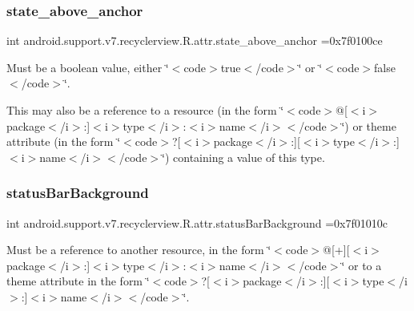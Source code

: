 \subsubsection{\texorpdfstring{state\+\_\+above\+\_\+anchor}{state\_above\_anchor}}
{\footnotesize\ttfamily int android.\+support.\+v7.\+recyclerview.\+R.\+attr.\+state\+\_\+above\+\_\+anchor =0x7f0100ce\hspace{0.3cm}{\ttfamily [static]}}

Must be a boolean value, either \char`\"{}$<$code$>$true$<$/code$>$\char`\"{} or \char`\"{}$<$code$>$false$<$/code$>$\char`\"{}. 

This may also be a reference to a resource (in the form \char`\"{}$<$code$>$@\mbox{[}$<$i$>$package$<$/i$>$\+:\mbox{]}$<$i$>$type$<$/i$>$\+:$<$i$>$name$<$/i$>$$<$/code$>$\char`\"{}) or theme attribute (in the form \char`\"{}$<$code$>$?\mbox{[}$<$i$>$package$<$/i$>$\+:\mbox{]}\mbox{[}$<$i$>$type$<$/i$>$\+:\mbox{]}$<$i$>$name$<$/i$>$$<$/code$>$\char`\"{}) containing a value of this type. \mbox{\label{classandroid_1_1support_1_1v7_1_1recyclerview_1_1R_1_1attr_abd953a9446d21bb5122214876a4d4a55}} 
\subsubsection{\texorpdfstring{status\+Bar\+Background}{statusBarBackground}}
{\footnotesize\ttfamily int android.\+support.\+v7.\+recyclerview.\+R.\+attr.\+status\+Bar\+Background =0x7f01010c\hspace{0.3cm}{\ttfamily [static]}}

Must be a reference to another resource, in the form \char`\"{}$<$code$>$@\mbox{[}+\mbox{]}\mbox{[}$<$i$>$package$<$/i$>$\+:\mbox{]}$<$i$>$type$<$/i$>$\+:$<$i$>$name$<$/i$>$$<$/code$>$\char`\"{} or to a theme attribute in the form \char`\"{}$<$code$>$?\mbox{[}$<$i$>$package$<$/i$>$\+:\mbox{]}\mbox{[}$<$i$>$type$<$/i$>$\+:\mbox{]}$<$i$>$name$<$/i$>$$<$/code$>$\char`\"{}. \mbox{\label{classandroid_1_1support_1_1v7_1_1recyclerview_1_1R_1_1attr_af5dfd94fd12b02dca28ce8629e2f81fb}} 
